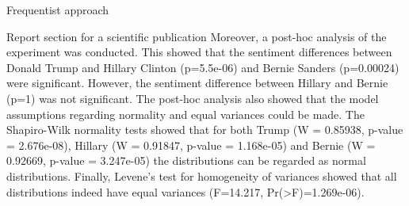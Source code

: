 \documentclass[
  ignorenonframetext,
]{beamer}
\begin{document}
\begin{frame}[fragile]{Frequentist approach}
\begin{block}{Report section for a scientific publication}
Moreover, a post-hoc analysis of the experiment was conducted. This
showed that the sentiment differences between Donald Trump and Hillary
Clinton (p=5.5e-06) and Bernie Sanders (p=0.00024) were significant.
However, the sentiment difference between Hillary and Bernie (p=1) was
not significant. The post-hoc analysis also showed that the model
assumptions regarding normality and equal variances could be made. The
Shapiro-Wilk normality tests showed that for both Trump (W = 0.85938,
p-value = 2.676e-08), Hillary (W = 0.91847, p-value = 1.168e-05) and
Bernie (W = 0.92669, p-value = 3.247e-05) the distributions can be
regarded as normal distributions. Finally, Levene's test for homogeneity
of variances showed that all distributions indeed have equal variances
(F=14.217, Pr(\textgreater F)=1.269e-06).
\end{block}
\end{frame}
\end{document}

